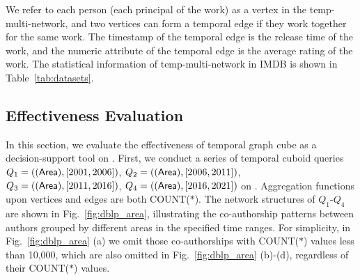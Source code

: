 \documentclass[10pt,journal,compsoc]{IEEEtran}
\begin{document}

We refer to each person (each principal of the work) as a vertex in the temp-multi-network, and two vertices can form a temporal edge if they work together for the same work. The timestamp of the temporal edge is the release time of the work, and the numeric attribute of the temporal edge is the average rating of the work. The statistical information of temp-multi-network in IMDB is shown in Table~\ref{tab:datasets}.

\subsection{Effectiveness Evaluation} \label{subsec:effectiveness_eva}
In this section, we evaluate the effectiveness of temporal graph cube as a decision-support tool on . First, we conduct a series of temporal cuboid queries $ Q_1=(({\mathsf{Area}}),[2001,2006]) $, $ Q_2=(({\mathsf{Area}}),[2006,2011]) $, $ Q_3=(({\mathsf{Area}}),[2011,2016]) $, $ Q_4=(({\mathsf{Area}}),[2016,2021]) $ on . Aggregation functions upon vertices and edges are both COUNT($\ast$). The network structures of $ Q_1 $-$ Q_4 $ are shown in Fig.~\ref{fig:dblp_area}, illustrating the co-authorship patterns between authors grouped by different areas in the specified time ranges. For simplicity, in Fig.~\ref{fig:dblp_area} (a) we omit those co-authorships with COUNT($\ast$) values less than 10,000, which are also omitted in Fig.~\ref{fig:dblp_area} (b)-(d), regardless of their COUNT($\ast$) values.
\end{document}
